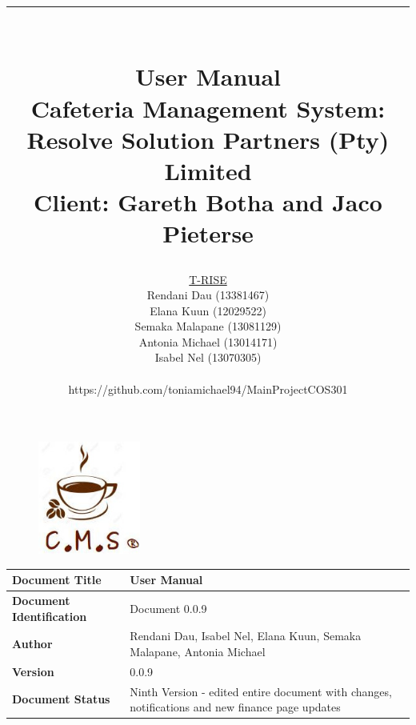 \documentclass[a4paper,12pt]{report}
\title{ \rule{\textwidth}{1pt}  \\ \Huge User Manual \\ 
	\Large Cafeteria Management System: Resolve Solution Partners (Pty) Limited \\
	\small Client: Gareth Botha and Jaco Pieterse}
\author{ 
         \underline{T-RISE}\\
          Rendani Dau (13381467) \\
	Elana Kuun (12029522) \\
	Semaka Malapane (13081129) \\
	Antonia Michael (13014171) \\
	Isabel Nel (13070305) \\ \\
	https://github.com/toniamichael94/MainProjectCOS301 \\ }
\date{\today \\ \rule{\textwidth}{1pt}}
\begin{document}
\maketitle
\break

\tableofcontents
\break

\begin{figure}[H]
  \centering
   \includegraphics[width=0.3\textwidth]{../images/cmslogo.jpg} 
\end{figure}
 \begin{tabu} to 0.8\textwidth { | X[l] | X[l] | }
 \hline
 \textbf{Document Title} & User Manual \\
 \hline
 \textbf{Document Identification}  & Document 0.0.9  \\
 \hline
 \textbf{Author}  & Rendani Dau, Isabel Nel, Elana Kuun, Semaka Malapane, Antonia Michael \\
 \hline
 \textbf{Version} & 0.0.9 \\
 \hline
 \textbf{Document Status} & Ninth Version - edited entire document with changes, notifications and new finance page updates\\
 \hline
 \end{tabu}
\end{document}
